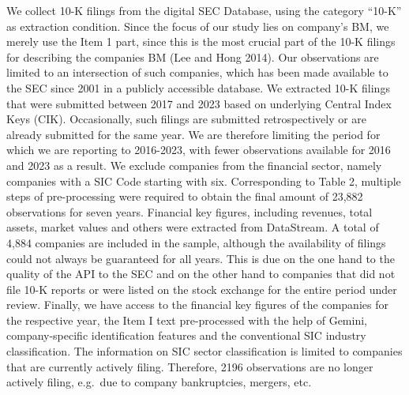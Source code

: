 \documentclass[
]{article}
\begin{document}
We collect 10-K filings from the digital SEC Database, using the
category ``10-K'' as extraction condition. Since the focus of our study
lies on company's BM, we merely use the Item 1 part, since this is the
most crucial part of the 10-K filings for describing the companies BM
(Lee and Hong 2014). Our observations are limited to an intersection of
such companies, which has been made available to the SEC since 2001 in a
publicly accessible database. We extracted 10-K filings that were
submitted between 2017 and 2023 based on underlying Central Index Keys
(CIK). Occasionally, such filings are submitted retrospectively or are
already submitted for the same year. We are therefore limiting the
period for which we are reporting to 2016-2023, with fewer observations
available for 2016 and 2023 as a result. We exclude companies from the
financial sector, namely companies with a SIC Code starting with six.
Corresponding to Table 2, multiple steps of pre-processing were required
to obtain the final amount of 23,882 observations for seven years.
Financial key figures, including revenues, total assets, market values
and others were extracted from DataStream. A total of 4,884 companies
are included in the sample, although the availability of filings could
not always be guaranteed for all years. This is due on the one hand to
the quality of the API to the SEC and on the other hand to companies
that did not file 10-K reports or were listed on the stock exchange for
the entire period under review. Finally, we have access to the financial
key figures of the companies for the respective year, the Item I text
pre-processed with the help of Gemini, company-specific identification
features and the conventional SIC industry classification. The
information on SIC sector classification is limited to companies that
are currently actively filing. Therefore, 2196 observations are no
longer actively filing, e.g.~due to company bankruptcies, mergers, etc.
\end{document}
